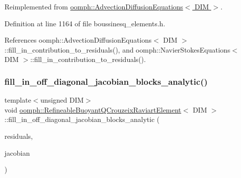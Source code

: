 Reimplemented from \hyperlink{classoomph_1_1AdvectionDiffusionEquations_ae56ee6b085c75be438a598244c527fb5}{oomph\+::\+Advection\+Diffusion\+Equations$<$ D\+I\+M $>$}.



Definition at line 1164 of file boussinesq\+\_\+elements.\+h.



References oomph\+::\+Advection\+Diffusion\+Equations$<$ D\+I\+M $>$\+::fill\+\_\+in\+\_\+contribution\+\_\+to\+\_\+residuals(), and oomph\+::\+Navier\+Stokes\+Equations$<$ D\+I\+M $>$\+::fill\+\_\+in\+\_\+contribution\+\_\+to\+\_\+residuals().

\mbox{\label{classoomph_1_1RefineableBuoyantQCrouzeixRaviartElement_a6fe93946149c696f273be12540099d1a}} 
\subsubsection{\texorpdfstring{fill\+\_\+in\+\_\+off\+\_\+diagonal\+\_\+jacobian\+\_\+blocks\+\_\+analytic()}{fill\_in\_off\_diagonal\_jacobian\_blocks\_analytic()}}
{\footnotesize\ttfamily template$<$unsigned D\+IM$>$ \\
void \hyperlink{classoomph_1_1RefineableBuoyantQCrouzeixRaviartElement}{oomph\+::\+Refineable\+Buoyant\+Q\+Crouzeix\+Raviart\+Element}$<$ D\+IM $>$\+::fill\+\_\+in\+\_\+off\+\_\+diagonal\+\_\+jacobian\+\_\+blocks\+\_\+analytic (\begin{DoxyParamCaption}\item[{\hyperlink{classoomph_1_1Vector}{Vector}$<$ double $>$ \&}]{residuals,  }\item[{\hyperlink{classoomph_1_1DenseMatrix}{Dense\+Matrix}$<$ double $>$ \&}]{jacobian }\end{DoxyParamCaption})\hspace{0.3cm}{\ttfamily [inline]}}



